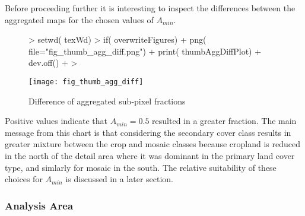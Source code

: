 Before proceeding further it is interesting to inspect the differences
between the aggregated maps for the chosen values of $A_{min}$.

\begin{Schunk}
\end{Schunk}

\begin{figure} 
\begin{center}
  
\begin{Schunk}
\begin{Sinput}
> setwd( texWd)
> if( overwriteFigures) {
+   png( file="fig_thumb_agg_diff.png")
+   print( thumbAggDiffPlot)
+   dev.off()
+ }
> 
\end{Sinput}
\end{Schunk}

\texttt{[image: fig\_thumb\_agg\_diff]}
\end{center} 
\caption{ Difference of aggregated sub-pixel fractions}
\label{fig:thumb_agg_diff}
\end{figure} 

Positive values indicate that $A_{min} = 0.5$ resulted in a greater
fraction.  The main message from this chart is that considering the
secondary cover class results in greater mixture between the crop and
mosaic classes because cropland is reduced in the north of the detail
area where it was dominant in the primary land cover type, and
simlarly for mosaic in the south.  The relative suitability of these
choices for $A_{min}$ is discussed in a later section. 

\subsubsection{Analysis Area}
\label{sec:agg-analysis-area}

